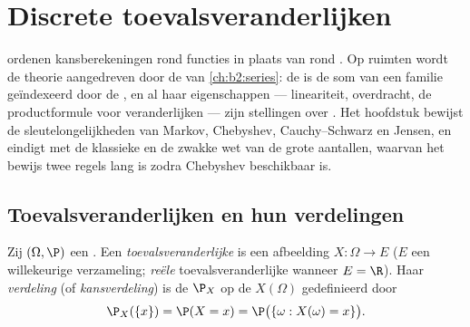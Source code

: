 \chapter{Discrete toevalsveranderlijken}\label{ch:b2:randomvar}

 ordenen kansberekeningen rond functies in
plaats van rond . Op  ruimten wordt de
theorie aangedreven door de  van
\cref{ch:b2:series}: de  is de som van een
familie geïndexeerd door de , en al haar
eigenschappen --- lineariteit, overdracht, de productformule voor
 veranderlijken --- zijn stellingen over . Het hoofdstuk bewijst de sleutelongelijkheden van Markov,
Chebyshev, Cauchy--Schwarz en Jensen, en eindigt met de klassieke
 en de zwakke wet van de grote aantallen, waarvan het
bewijs twee regels lang is zodra Chebyshev beschikbaar is.

\section{Toevalsveranderlijken en hun verdelingen}

\begin{definition}\label{def:b2:randomvar:law}
Zij $(\Omega, \P)$ een  . Een
\emph{toevalsveranderlijke} is een
afbeelding $X \colon \Omega \to E$ ($E$ een willekeurige
verzameling; \emph{reële} toevalsveranderlijke wanneer $E = \R$).
Haar \emph{verdeling}
(of \emph{kansverdeling}) is de 
$\P_X$ op de  $X(\Omega)$ gedefinieerd door
\[
\P_X(\{x\}) = \P(X = x)
= \P\bigl(\{\omega : X(\omega) = x\}\bigr) .
\]
\end{definition}

